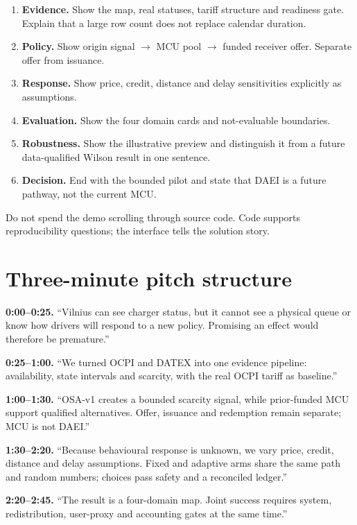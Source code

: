 \documentclass[11pt,a4paper]{article}
\begin{document}
\begin{enumerate}
\item \textbf{Evidence.} Show the map, real statuses, tariff structure and readiness gate. Explain that a large row count does not replace calendar duration.
\item \textbf{Policy.} Show origin signal $\to$ MCU pool $\to$ funded receiver offer. Separate offer from issuance.
\item \textbf{Response.} Show price, credit, distance and delay sensitivities explicitly as assumptions.
\item \textbf{Evaluation.} Show the four domain cards and not-evaluable boundaries.
\item \textbf{Robustness.} Show the illustrative preview and distinguish it from a future data-qualified Wilson result in one sentence.
\item \textbf{Decision.} End with the bounded pilot and state that DAEI is a future pathway, not the current MCU.
\end{enumerate}

Do not spend the demo scrolling through source code. Code supports reproducibility questions; the interface tells the solution story.

\section{Three-minute pitch structure}

\textbf{0:00--0:25.} ``Vilnius can see charger status, but it cannot see a physical queue or know how drivers will respond to a new policy. Promising an effect would therefore be premature.''

\textbf{0:25--1:00.} ``We turned OCPI and DATEX into one evidence pipeline: availability, state intervals and scarcity, with the real OCPI tariff as baseline.''

\textbf{1:00--1:30.} ``OSA-v1 creates a bounded scarcity signal, while prior-funded MCU support qualified alternatives. Offer, issuance and redemption remain separate; MCU is not DAEI.''

\textbf{1:30--2:20.} ``Because behavioural response is unknown, we vary price, credit, distance and delay assumptions. Fixed and adaptive arms share the same path and random numbers; choices pass safety and a reconciled ledger.''

\textbf{2:20--2:45.} ``The result is a four-domain map. Joint success requires system, redistribution, user-proxy and accounting gates at the same time.''
\end{document}
